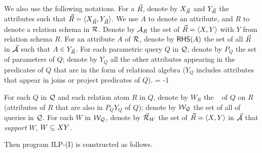 \vspace{0.36ex}
We also use the following notations. For a \bs $\vec{R}$,
denote by $X_{\vec{R}}$ and $Y_{\vec{R}}$ the attributes such that
$\vec{R}\allowbreak =\allowbreak  \langle X_{\vec{R}},\allowbreak Y_{\vec{R}}\rangle$.
We use $A$ to denote an attribute, and $R$ to denote a
relation schema in ${\mathcal R}$.
Denote by ${\mathcal A}_{R}$ the set of \bss $\vec{R} \allowbreak = \allowbreak
\langle X,\allowbreak Y\rangle$ with $Y$ from relation schema $R$. For an
attribute $A$ of ${\mathcal R}$, denote by ${\mathsf{RHS}}(A)$ the set of all \bss
$\vec{R}$ in $\vec{{\mathcal A}}$ such that $A\in Y_{\vec{R}}$.
%
For each parametric query $Q$ in $\mathcal Q$, denote by $P_{Q}$ the set
of parameters of $Q$; denote by $Y_{Q}$ all the other
attributes appearing %
in the predicates of $Q$ that
are in the form of relational
algebra (\ie $Y_{Q}$ includes attributes that appear %
in joins or project predicates of $Q$). 
\looseness = -1

\vspace{0.36ex}
For each $Q$ in $\mathcal Q$ and each relation atom $R$ in $Q$, denote by
$W_{R}$ the \qcs~\cite{blinkdb} of $Q$ on $R$ (\ie attributes of
$R$ that are also in $P_{Q}Y_{Q}$ of $Q$); denote by $\mathcal{W}_{\mathcal Q}$
the set of all \qcs of queries in $\mathcal Q$. For each \qcs $W$ in
$\mathcal{W}_{\mathcal Q}$, denote by $\vec{{\mathcal R}}_{W}$ the set of \bss $\vec{R}\allowbreak
=\allowbreak \langle X,\allowbreak Y\rangle$ in $\vec{{\mathcal A}}$ that {\em support} $W$, \ie
$W\allowbreak\subseteq\allowbreak XY$. 


\vspace{0.6ex}
Then program ILP-(I) is constructed as follows.

